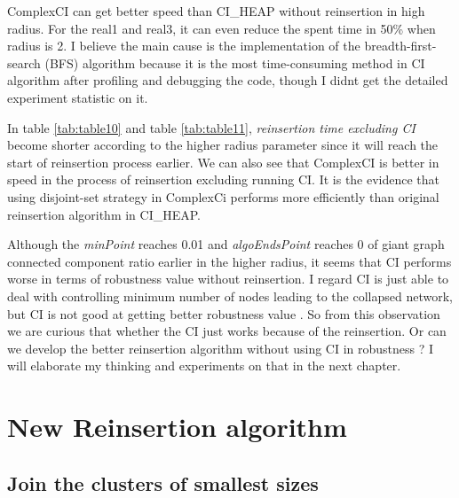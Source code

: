 \documentclass{article}
\begin{document}
\begin{enumerate}
	
		\begin{item}
			ComplexCI can get better speed than CI\_HEAP without reinsertion in high radius. For the real1 and real3, it can even reduce the spent time in 50\% when radius is 2. I believe the main cause is the implementation of the breadth-first-search (BFS) algorithm because it is the most time-consuming method in CI algorithm after profiling and debugging the code, though I didn\textquotesingle t get the detailed experiment statistic on it. 	
		\end{item}	
	
		\begin{item}	
			In table \ref{tab:table10} and table \ref{tab:table11}, \textit{reinsertion time excluding CI} become shorter according to the higher radius parameter since it will reach the start of reinsertion process earlier. We can also see that ComplexCI is better in speed in the process of reinsertion excluding running CI. It is the evidence that using disjoint-set strategy in ComplexCi performs more efficiently than original reinsertion algorithm in CI\_HEAP. 
		\end{item}	
	
		\begin{item}	
			Although the \textit{minPoint} reaches 0.01 and \textit{algoEndsPoint} reaches 0 of giant graph connected component ratio earlier in the higher radius, it seems that CI performs worse in terms of robustness value without reinsertion. I regard CI is just able to deal with controlling minimum number of nodes leading to the collapsed network, but CI is not good at getting better robustness value . So from this observation we are curious that whether the CI just works because of the reinsertion. Or can we develop the better reinsertion algorithm without using CI in robustness ? I will elaborate my thinking and experiments on that in the next chapter.	
		\end{item}		
		
	\end{enumerate}
			

	\section{New Reinsertion algorithm}

	\subsection{Join the clusters of smallest sizes}
\end{document}
